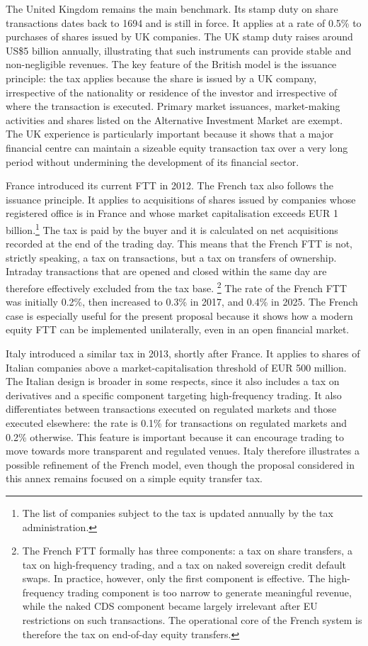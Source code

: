 \documentclass[../../main]{subfiles}
\begin{document}
The United Kingdom remains the main benchmark. Its stamp duty on share transactions dates back to 1694 and is still in force. It applies at a rate of 0.5\% to purchases of shares issued by UK companies. The UK stamp duty raises around US\$5 billion annually, illustrating that such instruments can provide stable and non-negligible revenues. The key feature of the British model is the issuance principle: the tax applies because the share is issued by a UK company, irrespective of the nationality or residence of the investor and irrespective of where the transaction is executed. Primary market issuances, market-making activities and shares listed on the Alternative Investment Market are exempt. The UK experience is particularly important because it shows that a major financial centre can maintain a sizeable equity transaction tax over a very long period without undermining the development of its financial sector.

France introduced its current FTT in 2012. The French tax also follows the issuance principle. It applies to acquisitions of shares issued by companies whose registered office is in France and whose market capitalisation exceeds EUR 1 billion.\footnote{The list of companies subject to the tax is updated annually by the tax administration.} The tax is paid by the buyer  and it is calculated on net acquisitions recorded at the end of the trading day. This means that the French FTT is not, strictly speaking, a tax on transactions, but a tax on transfers of ownership. Intraday transactions that are opened and closed within the same day are therefore effectively excluded from the tax base.
\footnote{The French FTT formally has three components: a tax on share transfers, a tax on high-frequency trading, and a tax on naked sovereign credit default swaps. In practice, however, only the first component is effective. The high-frequency trading component is too narrow to generate meaningful revenue, while the naked CDS component became largely irrelevant after EU restrictions on such transactions. The operational core of the French system is therefore the tax on end-of-day equity transfers.} The rate of the French FTT was initially 0.2\%, then increased to 0.3\% in 2017, and 0.4\% in 2025. The French case is especially useful for the present proposal because it shows how a modern equity FTT can be implemented unilaterally, even in an open financial market.

Italy introduced a similar tax in 2013, shortly after France. It applies to shares of Italian companies above a market-capitalisation threshold of EUR 500 million. The Italian design is broader in some respects, since it also includes a tax on derivatives and a specific component targeting high-frequency trading. It also differentiates between transactions executed on regulated markets and those executed elsewhere: the rate is 0.1\% for transactions on regulated markets and 0.2\% otherwise. This feature is important because it can encourage trading to move towards more transparent and regulated venues. Italy therefore illustrates a possible refinement of the French model, even though the proposal considered in this annex remains focused on a simple equity transfer tax.
\end{document}

